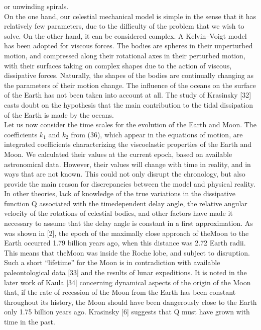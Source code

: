 \documentclass[fontsize = 11pt,a4paper]{article}
\begin{document}
\begin{multicols}{2}
or unwinding spirals. \\
\indent On the one hand, our celestial mechanical model
is simple in the sense that it has relatively few parameters,
due to the difficulty of the problem that
we wish to solve. On the other hand, it can be
considered complex. A Kelvin–Voigt model has been
adopted for viscous forces. The bodies are spheres in
their unperturbed motion, and compressed along their
rotational axes in their perturbed motion, with their
surfaces taking on complex shapes due to the action
of viscous, dissipative forces. Naturally, the shapes of
the bodies are continually changing as the parameters
of their motion change. The influence of the oceans
on the surface of the Earth has not been taken into
account at all. The study of Krasinsky [32] casts
doubt on the hypothesis that the main contribution
to the tidal dissipation of the Earth is made by the
oceans. \\
\indent Let us now consider the time scales for the evolution
of the Earth and Moon. The coefficients $k_1$
and $k_2$ from (36), which appear in the equations of
motion, are integrated coefficients characterizing the
viscoelastic properties of the Earth and Moon. We
calculated their values at the current epoch, based
on available astronomical data. However, their values
will change with time in reality, and in ways that are
not known. This could not only disrupt the chronology,
but also provide the main reason for discrepancies
between the model and physical reality. In other
theories, lack of knowledge of the true variations in
the dissipative function Q associated with the timedependent
delay angle, the relative angular velocity
of the rotations of celestial bodies, and other factors
have made it necessary to assume that the delay angle
is constant in a first approximation. As was shown
in [2], the epoch of the maximally close approach of
theMoon to the Earth occurred 1.79 billion years ago,
when this distance was 2.72 Earth radii. This means
that theMoon was inside the Roche lobe, and subject
to disruption. Such a short “lifetime” for the Moon
is in contradiction with available paleontological data
[33] and the results of lunar expeditions. It is noted
in the later work of Kaula [34] concerning dynamical
aspects of the origin of the Moon that, if the rate of
recession of the Moon from the Earth has been constant
throughout its history, the Moon should have
been dangerously close to the Earth only 1.75 billion
years ago. Krasinsky [6] suggests that Q must have
grown with time in the past. \\

\end{multicols}
\end{document}
